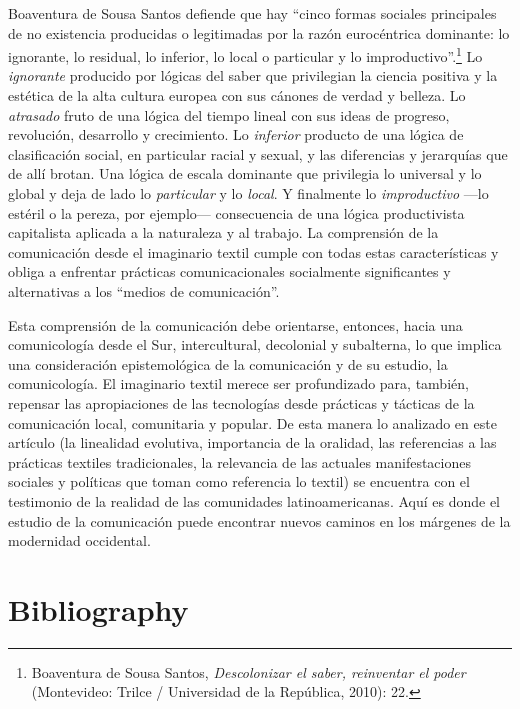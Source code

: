 \documentclass{tufte-handout}
\begin{document}
Boaventura de Sousa Santos defiende que hay ``cinco formas sociales
principales de no existencia producidas o legitimadas por la razón
eurocéntrica dominante: lo ignorante, lo residual, lo inferior, lo local
o particular y lo improductivo''.\footnote{Boaventura de Sousa Santos,
  \emph{Descolonizar el saber, reinventar el poder} (Montevideo: Trilce
  / Universidad de la República, 2010): 22.} Lo \emph{ignorante}
producido por lógicas del saber que privilegian la ciencia positiva y la
estética de la alta cultura europea con sus cánones de verdad y belleza.
Lo \emph{atrasado} fruto de una lógica del tiempo lineal con sus ideas
de progreso, revolución, desarrollo y crecimiento. Lo \emph{inferior}
producto de una lógica de clasificación social, en particular racial y
sexual, y las diferencias y jerarquías que de allí brotan. Una lógica de
escala dominante que privilegia lo universal y lo global y deja de lado
lo \emph{particular} y lo \emph{local}. Y finalmente lo
\emph{improductivo} ---lo estéril o la pereza, por ejemplo---
consecuencia de una lógica productivista capitalista aplicada a la
naturaleza y al trabajo. La comprensión de la comunicación desde el
imaginario textil cumple con todas estas características y obliga a
enfrentar prácticas comunicacionales socialmente significantes y
alternativas a los ``medios de comunicación''.

Esta comprensión de la comunicación debe orientarse, entonces, hacia una
comunicología desde el Sur, intercultural, decolonial y subalterna, lo
que implica una consideración epistemológica de la comunicación y de su
estudio, la comunicología. El imaginario textil merece ser profundizado
para, también, repensar las apropiaciones de las tecnologías desde
prácticas y tácticas de la comunicación local, comunitaria y popular. De
esta manera lo analizado en este artículo (la linealidad evolutiva,
importancia de la oralidad, las referencias a las prácticas textiles
tradicionales, la relevancia de las actuales manifestaciones sociales y
políticas que toman como referencia lo textil) se encuentra con el
testimonio de la realidad de las comunidades latinoamericanas. Aquí es
donde el estudio de la comunicación puede encontrar nuevos caminos en los m\'argenes de la modernidad occidental.


\vspace*{3em}

\section{Bibliography}\label{bibliography}
\end{document}
